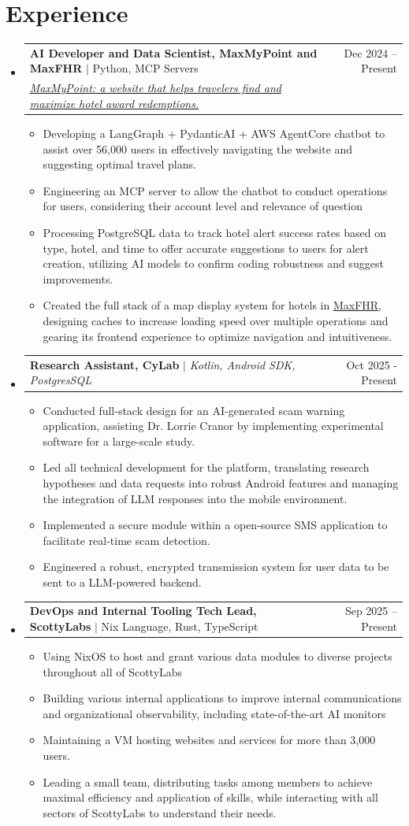 \documentclass[letterpaper,11pt]{article}
\makeatletter
\newcommand{\resumeItem}[1]{
  \item\small{
    {#1 \vspace{-2pt}}
  }
}
\newcommand{\resumeProjectLinkHeading}[3]{
    \item
    \begin{tabular*}{0.97\textwidth}{l@{\extracolsep{\fill}}r}
      \small#1 & #2 \\
      \small#3 \\
    \end{tabular*}\vspace{-7pt}
}
\newcommand{\resumeSmallJob}[2]{
    \item
    \begin{tabular*}{0.97\textwidth}{l@{\extracolsep{\fill}}r}
      \small#1 & #2 \\
    \end{tabular*}\vspace{-7pt}
}
\newcommand{\resumeSubHeadingListStart}{\begin{itemize}[leftmargin=0.15in, label={}]}
\newcommand{\resumeSubHeadingListEnd}{\end{itemize}}
\newcommand{\resumeItemListStart}{\begin{itemize}}
\newcommand{\resumeItemListEnd}{\end{itemize}\vspace{-5pt}}
\makeatother
\begin{document}
\section{Experience}
    \resumeSubHeadingListStart
        \resumeProjectLinkHeading
              {\textbf{AI Developer and Data Scientist, MaxMyPoint and MaxFHR} $|$ Python, MCP Servers}{Dec 2024 -- Present}
            {\href{https://maxmypoint.com/}{\textit{\underline{MaxMyPoint}: a website that helps travelers find and maximize hotel award redemptions.}}}
              \resumeItemListStart
                \resumeItem{Developing a LangGraph + PydanticAI + AWS AgentCore chatbot to assist over 56,000 users in effectively navigating the website and suggesting optimal travel plans.}
                \resumeItem{Engineering an MCP server to allow the chatbot to conduct operations for users, considering their account level and relevance of question}
                \resumeItem{Processing PostgreSQL data to track hotel alert success rates based on type, hotel, and time to offer accurate suggestions to users for alert creation, utilizing AI models to confirm coding robustness and suggest improvements.}
                \resumeItem{Created the full stack of a map display system for hotels in \href{https://maxfhr.com/}{\underline{MaxFHR}}, designing caches to increase loading speed over multiple operations and gearing its frontend experience to optimize navigation and intuitiveness.}
              \resumeItemListEnd

        \resumeSmallJob
        {\textbf{Research Assistant, CyLab} $|$ \emph{Kotlin, Android SDK, PostgresSQL}}{Oct 2025 - Present}
          \resumeItemListStart
            \resumeItem{Conducted full-stack design for an AI-generated scam warning application, assisting Dr. Lorrie Cranor by implementing experimental software for a large-scale study.}
            \resumeItem{Led all technical development for the platform, translating research hypotheses and data requests into robust Android features and managing the integration of LLM responses into the mobile environment.}
            \resumeItem{Implemented a secure module within a open-source SMS application to facilitate real-time scam detection.}
            \resumeItem{Engineered a robust, encrypted transmission system for user data to be sent to a LLM-powered backend.}
          \resumeItemListEnd

        \resumeSmallJob
          {\textbf{DevOps and Internal Tooling Tech Lead, ScottyLabs} $|$ Nix Language, Rust, TypeScript}{Sep 2025 -- Present}
          \resumeItemListStart
            \resumeItem{Using NixOS to host and grant various data modules to diverse projects throughout all of ScottyLabs}
            \resumeItem{Building various internal applications to improve internal communications and organizational observability, including state-of-the-art AI monitors}
            \resumeItem{Maintaining a VM hosting websites and services for more than 3,000 users.}
            \resumeItem{Leading a small team, distributing tasks among members to achieve maximal efficiency and application of skills, while interacting with all sectors of ScottyLabs to understand their needs.}
          \resumeItemListEnd
    \resumeSubHeadingListEnd
\end{document}
